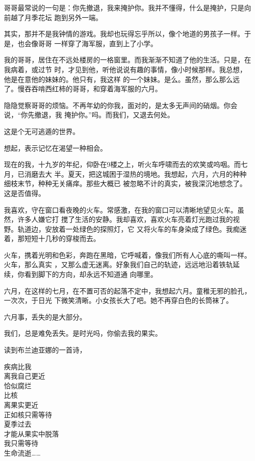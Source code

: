\documentclass[12pt,a4paper]{article}
\def\blankrev{\vspace{1ex}}									%
\begin{document}
		哥哥最常说的一句是：你先撤退，我来掩护你。我并不懂得，什么是掩护，只是向前越了月季花坛
	跑到另外一端。

		其实，那并不是我钟情的游戏。我却也玩得忘乎所以，像个地道的男孩子一样。于是，也会像哥哥
	一样穿了海军服，直到上了小学。

		我的哥哥，居住在不远处楼房的一格窗里。而我渐渐不知道了他的生活。只是，在我病着，或过节
	时，才见到他，听他说说有趣的事情，像小时候那样。我总想，他是在意他的妹妹的。他只有，我这样
	的一个妹妹。是么。虽然，那么那么远了。慢吞吞啃西红柿的哥哥，和穿着海军服的六月。

		隐隐觉察哥哥的烦恼。不再年幼的你我，面对的，是太多无声间的硝烟。你会说，“你先撤退，我
	掩护你。”吗。而我们，又退去何处。

		\blankrev

		这是个无可逃遁的世界。\par
		想起，表示记忆在渴望一种相会。

		现在的我，十九岁的年纪，仰卧在9楼之上，听火车呼啸而去的欢笑或呜咽。而七月，已消磨去大
	半。夏天，把这城困于湿热的境地。我想起，六月，六月的种种细枝末节，种种无关痛痒。那些大概已
	被忽略不计的真实，被我深沉地想念了。这是否值得。

		我喜欢，守在窗口看夜晚的火车。常感激，在我的窗口可以清晰地望见火车。虽然，许多人嫌它打
	搅了生活的安静。我却喜欢，喜欢火车亮着灯光跑过我的视野。轨道边，安放着一处绿色的探照灯，它
	又将火车的车身染成了绿色。我痴迷着，那短短十几秒的穿梭而去。

		火车，携着光明和色彩，奔跑在黑暗，它呼喊着，像我们所有人心底的嘶叫一样。火车，那么真实
	，又那么虚无迷离。好象我们自己的轨迹，远远地沿着铁轨延续，你看到脚下的方向，却永远不知道通
	向哪里。

		六月，在这样的七月，在不置可否的起落不定中，我想起六月。童稚无邪的脸孔，一次次，于日光
	下微笑清晰。小女孩长大了吧。她不再穿白色的长筒袜了。

		六月事，丢失的是大部分。\par
		我们，总是难免丢失。是时光吗，你偷去我的果实。

	\endwriting



		读到布兰迪亚娜的一首诗，

		\longpoem{}{}{}
		疾病比我 \\
		离我自己更近 \\
		恰似腐烂 \\
		比核 \\
		离果实更近 \\
		正如核只需等待 \\
		夏季过去 \\
		才能从果实中脱落 \\
		我只需等待 \\
		生命流逝……
		\endlongpoem
\end{document}
